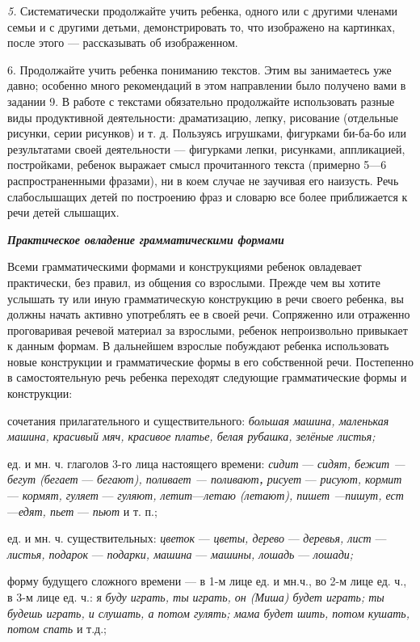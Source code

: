 \documentclass{book}
\renewcommand{\emph}[1]{\textit{#1}}
\begin{document}
\emph{5.} Систематически продолжайте учить ребенка, одного или с другими
членами семьи и с другими детьми, демонстрировать то, что изображено на
картинках, после этого --- рассказывать об изображенном.

6. Продолжайте учить ребенка пониманию текстов. Этим вы занимаетесь уже
давно; особенно много рекомендаций в этом направлении было получено вами
в задании 9. В работе с текстами обязательно продолжайте использовать
разные виды продуктивной деятельности: драматизацию, лепку, рисование
(отдельные рисунки, серии рисунков) и т. д. Пользуясь игрушками,
фигурками би-ба-бо или результатами своей деятельности --- фигурками
лепки, рисунками, аппликацией, постройками, ребенок выражает смысл
прочитанного текста (примерно 5---6 распространенными фразами), ни в
коем случае не заучивая его наизусть. Речь слабослышащих детей по
построению фраз и словарю все более приближается к речи детей слышащих.

\emph{\textbf{Практическое овладение грамматическими формами}}

Всеми грамматическими формами и конструкциями ребенок овладевает
практически, без правил, из общения со взрослыми. Прежде чем вы хотите
услышать ту или иную грамматическую конструкцию в речи своего ребенка,
вы должны начать активно употреблять ее в своей речи. Сопряженно или
отраженно проговаривая речевой материал за взрослыми, ребенок
непроизвольно привыкает к данным формам. В дальнейшем взрослые побуждают
ребенка использовать новые конструкции и грамматические формы в его
собственной речи. Постепенно в самостоятельную речь ребенка переходят
следующие грамматические формы и конструкции:

сочетания прилагательного и существительного: \emph{большая машина,
маленькая машина, красивый мяч, красивое платье, белая рубашка, зелёные
листья;}

ед. и мн. ч. глаголов 3-го лица настоящего времени: \emph{сидит} ---
\emph{сидят, бежит ---бегут (бегает} --- \emph{бегают), поливает ---
поливают\textbf{,} рисует} --- \emph{рисуют, кормит} --- \emph{кормят,
гуляет} --- \emph{гуляют, летит}---\emph{летаю (летают), пишет ---пишут,
ест}---\emph{едят, пьет} --- \emph{пьют} и т. п.;

ед. и мн. ч. существительных: \emph{цветок} --- \emph{цветы, дерево} ---
\emph{деревья, лист} --- \emph{листья, подарок} --- \emph{подарки,
машина} --- \emph{машины, лошадь} --- \emph{лошади;}

форму будущего сложного времени --- в 1-м лице ед. и мн.ч., во 2-м лице
ед. ч., в 3-м лице ед. ч.: я \emph{буду играть, ты играть, он (Миша)
будет играть; ты будешь играть, и слушать, а потом гулять; мама будет
шить, потом кушать, потом спать} и т.д.;
\end{document}
